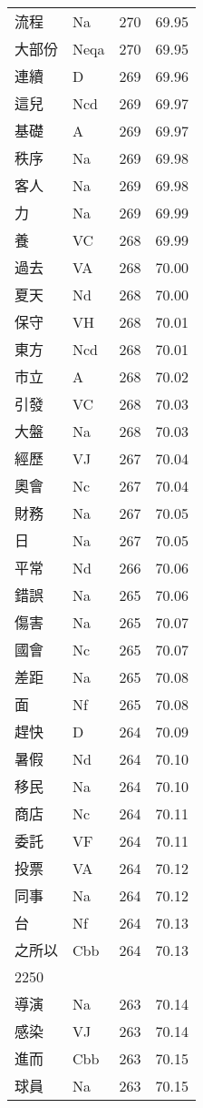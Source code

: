 \documentclass[twocolumn]{book}
\begin{document}
\begin{supertabular}{llrr}
流程 & Na & 270 &  69.95\\
大部份 & Neqa & 270 &  69.95\\
連續 & D & 269 &  69.96\\
這兒 & Ncd & 269 &  69.97\\
基礎 & A & 269 &  69.97\\
秩序 & Na & 269 &  69.98\\
客人 & Na & 269 &  69.98\\
力 & Na & 269 &  69.99\\
養 & VC & 268 &  69.99\\
過去 & VA & 268 &  70.00\\
夏天 & Nd & 268 &  70.00\\
保守 & VH & 268 &  70.01\\
東方 & Ncd & 268 &  70.01\\
市立 & A & 268 &  70.02\\
引發 & VC & 268 &  70.03\\
大盤 & Na & 268 &  70.03\\
經歷 & VJ & 267 &  70.04\\
奧會 & Nc & 267 &  70.04\\
財務 & Na & 267 &  70.05\\
日 & Na & 267 &  70.05\\
平常 & Nd & 266 &  70.06\\
錯誤 & Na & 265 &  70.06\\
傷害 & Na & 265 &  70.07\\
國會 & Nc & 265 &  70.07\\
差距 & Na & 265 &  70.08\\
面 & Nf & 265 &  70.08\\
趕快 & D & 264 &  70.09\\
暑假 & Nd & 264 &  70.10\\
移民 & Na & 264 &  70.10\\
商店 & Nc & 264 &  70.11\\
委託 & VF & 264 &  70.11\\
投票 & VA & 264 &  70.12\\
同事 & Na & 264 &  70.12\\
台 & Nf & 264 &  70.13\\
之所以 & Cbb & 264 &  70.13\\
2250\\
導演 & Na & 263 &  70.14\\
感染 & VJ & 263 &  70.14\\
進而 & Cbb & 263 &  70.15\\
球員 & Na & 263 &  70.15\\

\end{supertabular}
\end{document}
